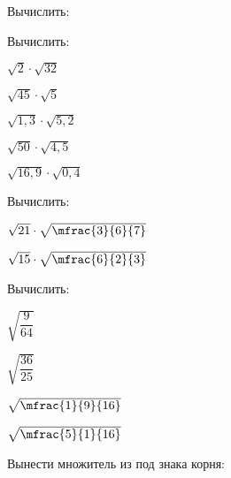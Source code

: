 \begin{class}[number=3]
\begin{listofex}
\begin{enumcols}[itemcolumns=3]
			
		\end{enumcols}
		\item Вычислить:
		\begin{enumcols}[itemcolumns=3]
			\item {}
			\item {}
			\item {}
		\end{enumcols}
		\item Вычислить:
		\begin{enumcols}[itemcolumns=5]
			\item \( \sqrt{2}\cdot\sqrt{32} \)
			\item \( \sqrt{45}\cdot\sqrt{5} \)
			\item \( \sqrt{1,3}\cdot\sqrt{5,2} \)
			\item \( \sqrt{50}\cdot\sqrt{4,5} \)
			\item \( \sqrt{16,9}\cdot\sqrt{0,4} \)
		\end{enumcols}
		\item Вычислить:
		\begin{enumcols}[itemcolumns=4]
			\item \( \sqrt{21}\cdot\sqrt{\mfrac{3}{6}{7}} \)
			\item \( \sqrt{15}\cdot\sqrt{\mfrac{6}{2}{3}} \)
			\item {}
			\item {}
		\end{enumcols}
		\item Вычислить:
		\begin{enumcols}[itemcolumns=4]
			\item \( \sqrt{\dfrac{9}{64}} \)
			\item \( \sqrt{\dfrac{36}{25}} \)
			\item \( \sqrt{\mfrac{1}{9}{16}} \)
			\item \( \sqrt{\mfrac{5}{1}{16}} \)
			\item {}
			\item {}
			\item {}
			\item {}
		\end{enumcols}
		\item Вынести множитель из под знака корня:

\end{listofex}
\end{class}
